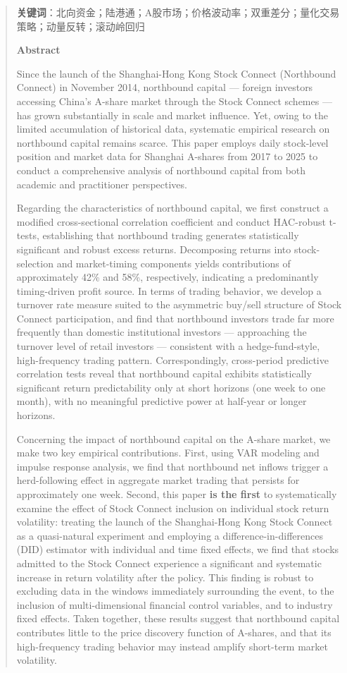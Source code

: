 \documentclass{article}
\begin{document}
\begin{abstract}
\textbf{关键词}：北向资金；陆港通；A股市场；价格波动率；双重差分；量化交易策略；动量反转；滚动岭回归

\newpage

\textbf{Abstract}

Since the launch of the Shanghai-Hong Kong Stock Connect (Northbound Connect) in November 2014, northbound capital — foreign investors accessing China's A-share market through the Stock Connect schemes — has grown substantially in scale and market influence. Yet, owing to the limited accumulation of historical data, systematic empirical research on northbound capital remains scarce. This paper employs daily stock-level position and market data for Shanghai A-shares from 2017 to 2025 to conduct a comprehensive analysis of northbound capital from both academic and practitioner perspectives.

Regarding the characteristics of northbound capital, we first construct a modified cross-sectional correlation coefficient and conduct HAC-robust t-tests, establishing that northbound trading generates statistically significant and robust excess returns. Decomposing returns into stock-selection and market-timing components yields contributions of approximately 42\% and 58\%, respectively, indicating a predominantly timing-driven profit source. In terms of trading behavior, we develop a turnover rate measure suited to the asymmetric buy/sell structure of Stock Connect participation, and find that northbound investors trade far more frequently than domestic institutional investors — approaching the turnover level of retail investors — consistent with a hedge-fund-style, high-frequency trading pattern. Correspondingly, cross-period predictive correlation tests reveal that northbound capital exhibits statistically significant return predictability only at short horizons (one week to one month), with no meaningful predictive power at half-year or longer horizons.

Concerning the impact of northbound capital on the A-share market, we make two key empirical contributions. First, using VAR modeling and impulse response analysis, we find that northbound net inflows trigger a herd-following effect in aggregate market trading that persists for approximately one week. Second, this paper \textbf{is the first} to systematically examine the effect of Stock Connect inclusion on individual stock return volatility: treating the launch of the Shanghai-Hong Kong Stock Connect as a quasi-natural experiment and employing a difference-in-differences (DID) estimator with individual and time fixed effects, we find that stocks admitted to the Stock Connect experience a significant and systematic increase in return volatility after the policy. This finding is robust to excluding data in the windows immediately surrounding the event, to the inclusion of multi-dimensional financial control variables, and to industry fixed effects. Taken together, these results suggest that northbound capital contributes little to the price discovery function of A-shares, and that its high-frequency trading behavior may instead amplify short-term market volatility.


\end{abstract}
\end{document}
